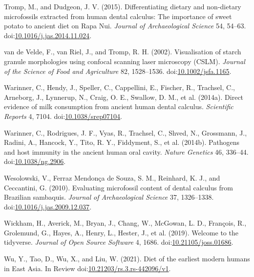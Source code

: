 \documentclass[utf8]{frontiers/frontiersSCNS}
\newlength{\cslhangindent}
\newlength{\cslentryspacingunit} %
\newenvironment{CSLReferences}[2] %
 {%
  \setlength{\parindent}{0pt}
  \ifodd #1
  \let\oldpar\par
  \def\par{\hangindent=\cslhangindent\oldpar}
  \fi
  \setlength{\parskip}{#2\cslentryspacingunit}
 }%
 {}
\begin{document}
\begin{CSLReferences}{1}{0}
\leavevmode{}%
Tromp, M., and Dudgeon, J. V. (2015). Differentiating dietary and non-dietary microfossils extracted from human dental calculus: The importance of sweet potato to ancient diet on {Rapa Nui}. \emph{Journal of Archaeological Science} 54, 54--63. doi:\href{https://doi.org/10.1016/j.jas.2014.11.024}{10.1016/j.jas.2014.11.024}.

\leavevmode{}%
van de Velde, F., van Riel, J., and Tromp, R. H. (2002). Visualisation of starch granule morphologies using confocal scanning laser microscopy ({CSLM}). \emph{Journal of the Science of Food and Agriculture} 82, 1528--1536. doi:\href{https://doi.org/10.1002/jsfa.1165}{10.1002/jsfa.1165}.

\leavevmode{}%
Warinner, C., Hendy, J., Speller, C., Cappellini, E., Fischer, R., Trachsel, C., Arneborg, J., Lynnerup, N., Craig, O. E., Swallow, D. M., et al. (2014a). Direct evidence of milk consumption from ancient human dental calculus. \emph{Scientific Reports} 4, 7104. doi:\href{https://doi.org/10.1038/srep07104}{10.1038/srep07104}.

\leavevmode{}%
Warinner, C., Rodrigues, J. F., Vyas, R., Trachsel, C., Shved, N., Grossmann, J., Radini, A., Hancock, Y., Tito, R. Y., Fiddyment, S., et al. (2014b). Pathogens and host immunity in the ancient human oral cavity. \emph{Nature Genetics} 46, 336--44. doi:\href{https://doi.org/10.1038/ng.2906}{10.1038/ng.2906}.

\leavevmode{}%
Wesolowski, V., Ferraz Mendonça de Souza, S. M., Reinhard, K. J., and Ceccantini, G. (2010). Evaluating microfossil content of dental calculus from {Brazilian} sambaquis. \emph{Journal of Archaeological Science} 37, 1326--1338. doi:\href{https://doi.org/10.1016/j.jas.2009.12.037}{10.1016/j.jas.2009.12.037}.

\leavevmode{}%
Wickham, H., Averick, M., Bryan, J., Chang, W., McGowan, L. D., François, R., Grolemund, G., Hayes, A., Henry, L., Hester, J., et al. (2019). Welcome to the {tidyverse}. \emph{Journal of Open Source Software} 4, 1686. doi:\href{https://doi.org/10.21105/joss.01686}{10.21105/joss.01686}.

\leavevmode{}%
Wu, Y., Tao, D., Wu, X., and Liu, W. (2021). Diet of the earliest modern humans in {East Asia}. {In Review} doi:\href{https://doi.org/10.21203/rs.3.rs-442096/v1}{10.21203/rs.3.rs-442096/v1}.

\end{CSLReferences}
\end{document}
